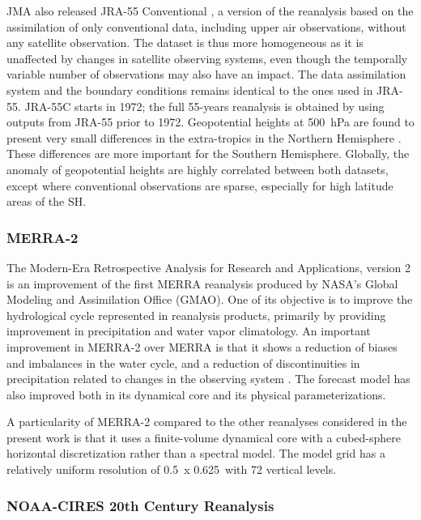 \documentclass{ametsoc}
\begin{document}
JMA also released JRA-55 Conventional \citep[JRA-55C --][]{Kobayashi2014}, a version of the reanalysis based on the assimilation of only conventional data, including upper air observations, without any satellite observation. The dataset is thus more homogeneous as it is unaffected by changes in satellite observing systems, even though the temporally variable number of observations may also have an impact. The data assimilation system and the boundary conditions remains identical to the ones used in JRA-55. JRA-55C starts in 1972; the full 55-years reanalysis is obtained by using outputs from JRA-55 prior to 1972. Geopotential heights at 500~hPa are found to present very small differences in the extra-tropics in the Northern Hemisphere \citep{Kobayashi2014}. These differences are more important for the Southern Hemisphere. Globally, the anomaly of geopotential heights are highly correlated between both datasets, except where conventional observations are sparse, especially for high latitude areas of the SH.


\subsubsection{MERRA-2}

The Modern-Era Retrospective Analysis for Research and Applications, version 2  \citep[MERRA-2 -- ][]{Gelaro2017} is an improvement of the first MERRA reanalysis \citep{Rienecker2011} produced by NASA's Global Modeling and Assimilation Office (GMAO). One of its objective is to improve the hydrological cycle represented in reanalysis products, primarily by providing improvement in precipitation and water vapor climatology. An important improvement in MERRA-2 over MERRA is that it shows a reduction of biases and imbalances in the water cycle, and a reduction of discontinuities in precipitation related to changes in the observing system \citep{Gelaro2017}. The forecast model has also improved both in its dynamical core and its physical parameterizations.

A particularity of MERRA-2 compared to the other reanalyses considered in the present work is that it uses a finite-volume dynamical core with a cubed-sphere horizontal discretization rather than a spectral model. The model grid has a relatively uniform resolution of 0.5\degree\ x 0.625\degree\ with 72 vertical levels.


\subsubsection{NOAA-CIRES 20th Century Reanalysis}
\end{document}
